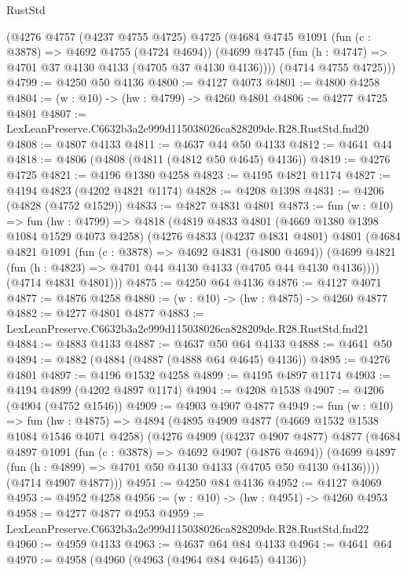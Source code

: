 \begin{lexlean}{RustStd}
\begin{coremodule}
      (@4276
        @4757
        (@4237 @4755 @4725)
        @4725
        (@4684
          @4745
          @1091
          (fun (c : @3878) => @4692 @4755 (@4724 @4694))
          (@4699 @4745 (fun (h : @4747) => @4701 @37 @4130 @4133 (@4705 @37 @4130 @4136))))
        (@4714 @4755 @4725)))
@4799 := @4250 @50 @4136
@4800 := @4127 @4073
@4801 := @4800 @4258
@4804 := (w : @10) -> (hw : @4799) -> @4260 @4801
@4806 := @4277 @4725 @4801
@4807 := LexLeanPreserve.C6632b3a2e999d115038026ca828209de.R28.RustStd.fnd20
@4808 := @4807 @4133
@4811 := @4637 @44 @50 @4133
@4812 := @4641 @44
@4818 := @4806 (@4808 (@4811 (@4812 @50 @4645) @4136))
@4819 := @4276 @4725
@4821 := @4196 @1380 @4258
@4823 := @4195 @4821 @1174
@4827 := @4194 @4823 (@4202 @4821 @1174)
@4828 := @4208 @1398
@4831 := @4206 (@4828 (@4752 @1529))
@4833 := @4827 @4831 @4801
@4873 := fun (w : @10) =>
  fun (hw : @4799) =>
  @4818
    (@4819
      @4833
      @4801
      (@4669 @1380 @1398 @1084 @1529 @4073 @4258)
      (@4276
        @4833
        (@4237 @4831 @4801)
        @4801
        (@4684
          @4821
          @1091
          (fun (c : @3878) => @4692 @4831 (@4800 @4694))
          (@4699 @4821 (fun (h : @4823) => @4701 @44 @4130 @4133 (@4705 @44 @4130 @4136))))
        (@4714 @4831 @4801)))
@4875 := @4250 @64 @4136
@4876 := @4127 @4071
@4877 := @4876 @4258
@4880 := (w : @10) -> (hw : @4875) -> @4260 @4877
@4882 := @4277 @4801 @4877
@4883 := LexLeanPreserve.C6632b3a2e999d115038026ca828209de.R28.RustStd.fnd21
@4884 := @4883 @4133
@4887 := @4637 @50 @64 @4133
@4888 := @4641 @50
@4894 := @4882 (@4884 (@4887 (@4888 @64 @4645) @4136))
@4895 := @4276 @4801
@4897 := @4196 @1532 @4258
@4899 := @4195 @4897 @1174
@4903 := @4194 @4899 (@4202 @4897 @1174)
@4904 := @4208 @1538
@4907 := @4206 (@4904 (@4752 @1546))
@4909 := @4903 @4907 @4877
@4949 := fun (w : @10) =>
  fun (hw : @4875) =>
  @4894
    (@4895
      @4909
      @4877
      (@4669 @1532 @1538 @1084 @1546 @4071 @4258)
      (@4276
        @4909
        (@4237 @4907 @4877)
        @4877
        (@4684
          @4897
          @1091
          (fun (c : @3878) => @4692 @4907 (@4876 @4694))
          (@4699 @4897 (fun (h : @4899) => @4701 @50 @4130 @4133 (@4705 @50 @4130 @4136))))
        (@4714 @4907 @4877)))
@4951 := @4250 @84 @4136
@4952 := @4127 @4069
@4953 := @4952 @4258
@4956 := (w : @10) -> (hw : @4951) -> @4260 @4953
@4958 := @4277 @4877 @4953
@4959 := LexLeanPreserve.C6632b3a2e999d115038026ca828209de.R28.RustStd.fnd22
@4960 := @4959 @4133
@4963 := @4637 @64 @84 @4133
@4964 := @4641 @64
@4970 := @4958 (@4960 (@4963 (@4964 @84 @4645) @4136))

\end{coremodule}
\end{lexlean}
